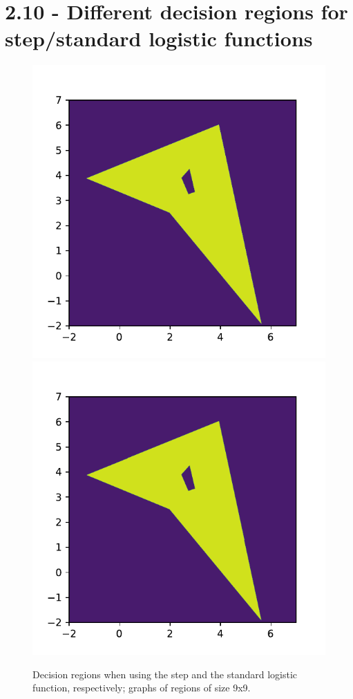 \documentclass[12pt]{article}
\begin{document}
\section*{2.10 - Different decision regions for step/standard logistic functions}
\begin{figure}[!htb]
\includegraphics[scale=0.8]{t2_regions_hNN_AB.pdf}
\includegraphics[scale=0.8]{t2_regions_sNN_AB.pdf}
\caption{Decision regions when using the step and the standard logistic function, respectively; graphs of regions of size 9x9.}
\label{regions_comp}

\end{figure}
\end{document}
